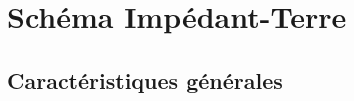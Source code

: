 

\begin{comment}

\documentclass[a4paper, 11pt, twoside, fleqn]{memoir}

\usepackage{AOCDTF}

\marqueurchapitre
\decoupagechapitre{1} %


	\openleft %

\end{comment}

\chapter{Schéma Impédant-Terre\label{chap:schema_it}}
\ChapFrame

\section{Caractéristiques générales}

